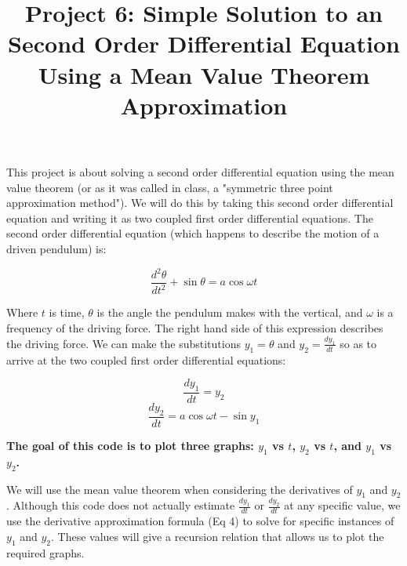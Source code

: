 \documentclass[11pt]{amsart}
\title{Project 6: Simple Solution to an Second Order Differential Equation Using a Mean Value Theorem Approximation}
\begin{document}
\maketitle

This project is about solving a second order differential equation using the mean value theorem (or as it was called in class, a "symmetric three point approximation method").  We will do this by taking this second order differential equation and writing it as two coupled first order differential equations.  The second order differential equation (which happens to describe the motion of a driven pendulum) is:

\begin{equation}
\frac{d^{2} \theta}{d t^{2}} + \sin{\theta} = a \cos{\omega t}
\end{equation}
\vspace{2 mm}

Where $t$ is time, $\theta$ is the angle the pendulum makes with the vertical, and $\omega$ is a frequency of the driving force.  The right hand side of this expression describes the driving force.  We can make the substitutions $y_1 = \theta$ and $y_2 = \frac{d y_1}{d t}$ so as to arrive at the two coupled first order differential equations:

\begin{equation}
\frac{d y_1}{dt} = y_2
\end{equation}
\begin{equation}
\frac{d y_2}{dt} = a \cos{\omega t}- \sin{y_1}
\end{equation}
\vspace{2 mm}

\textbf{The goal of this code is to plot three graphs: $y_1$ vs $t$, $y_2$ vs $t$, and $y_1$ vs $y_2$.}
\newline

We will use the mean value theorem when considering the derivatives of $y_1$ and $y_2$.  Although this code does not actually estimate $\frac{d y_1}{dt}$ or $\frac{d y_2}{dt}$ at any specific value, we use the derivative approximation formula (Eq 4) to solve for specific instances of $y_1$ and $y_2$.  These values will give a recursion relation that allows us to plot the required graphs.
\newline
\end{document}

